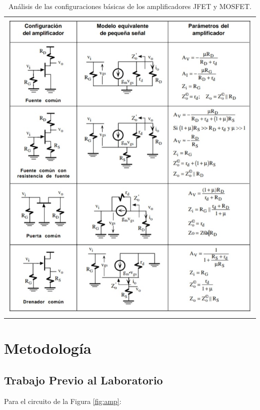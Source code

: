 \documentclass[12pt, a4paper]{article}
\begin{document}
    \begin{table}[h!]
        \centering
        \caption{Análisis de las configuraciones básicas de los amplificadores JFET y MOSFET.} 
        \label{tab:mt1}
        \begin{tabular}{c}
            \includegraphics[width=16cm\textwidth]{configuraciones.jpg} \\
        \end{tabular}
    \end{table}

    \newpage

    \section{Metodología}

    \subsection{Trabajo Previo al Laboratorio}

    Para el circuito de la Figura \ref{fig:amp}:
\end{document}
